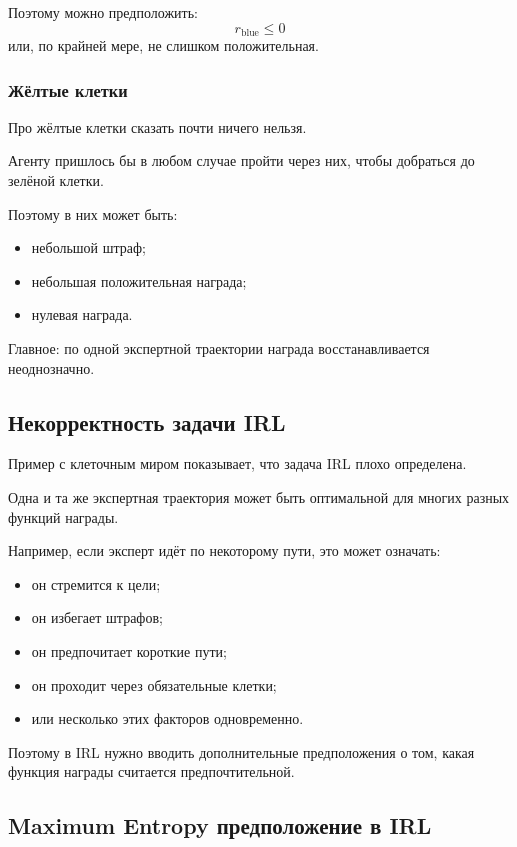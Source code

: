 \documentclass[12pt,a4paper]{article}
\begin{document}
Поэтому можно предположить:
\[
r_{\mathrm{blue}}\le 0
\]
или, по крайней мере, не слишком положительная.

\subsubsection{Жёлтые клетки}

Про жёлтые клетки сказать почти ничего нельзя.

Агенту пришлось бы в любом случае пройти через них, чтобы добраться до зелёной клетки.

Поэтому в них может быть:
\begin{itemize}
    \item небольшой штраф;
    \item небольшая положительная награда;
    \item нулевая награда.
\end{itemize}

Главное: по одной экспертной траектории награда восстанавливается неоднозначно.

\subsection{Некорректность задачи IRL}

Пример с клеточным миром показывает, что задача IRL плохо определена.

Одна и та же экспертная траектория может быть оптимальной для многих разных функций награды.

Например, если эксперт идёт по некоторому пути, это может означать:
\begin{itemize}
    \item он стремится к цели;
    \item он избегает штрафов;
    \item он предпочитает короткие пути;
    \item он проходит через обязательные клетки;
    \item или несколько этих факторов одновременно.
\end{itemize}

Поэтому в IRL нужно вводить дополнительные предположения о том, какая функция награды считается предпочтительной.

\subsection{Maximum Entropy предположение в IRL}
\end{document}

